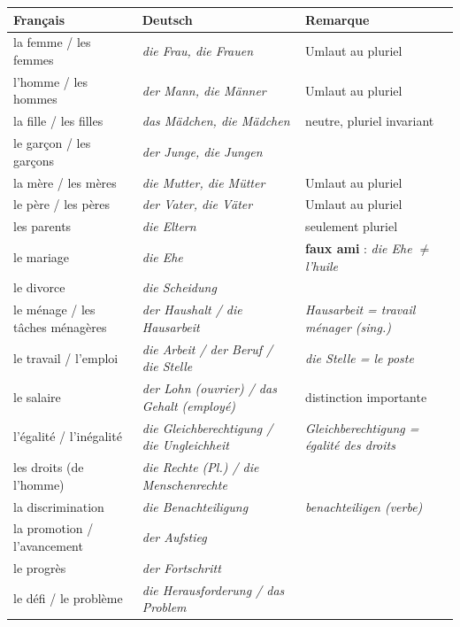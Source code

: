 \documentclass[11pt]{article}
\newcommand{\all}[1]{\ifmmode\text{\textit{#1}}\else\begingroup\selectlanguage{ngerman}\itshape #1\endgroup\fi}
\begin{document}
\begin{aretenir}
\begin{center}
\begin{tabularx}{\linewidth}{|X|X|X|}
\hline
\rowcolor{popblueL} \textbf{Français} & \textbf{Deutsch} & \textbf{Remarque} \\
\hline
la femme / les femmes & \all{die Frau, die Frauen} & Umlaut au pluriel \\
l'homme / les hommes & \all{der Mann, die Männer} & Umlaut au pluriel \\
la fille / les filles & \all{das Mädchen, die Mädchen} & neutre, pluriel invariant \\
le garçon / les garçons & \all{der Junge, die Jungen} & \\
la mère / les mères & \all{die Mutter, die Mütter} & Umlaut au pluriel \\
le père / les pères & \all{der Vater, die Väter} & Umlaut au pluriel \\
les parents & \all{die Eltern} & seulement pluriel \\
le mariage & \all{die Ehe} & \textbf{faux ami} : \all{die Ehe} $\neq$ l'huile \\
le divorce & \all{die Scheidung} & \\
le ménage / les tâches ménagères & \all{der Haushalt} / \all{die Hausarbeit} & \all{Hausarbeit} = travail ménager (sing.) \\
le travail / l'emploi & \all{die Arbeit} / \all{der Beruf} / \all{die Stelle} & \all{die Stelle} = le poste \\
le salaire & \all{der Lohn} (ouvrier) / \all{das Gehalt} (employé) & distinction importante \\
l'égalité / l'inégalité & \all{die Gleichberechtigung} / \all{die Ungleichheit} & \all{Gleichberechtigung} = égalité des droits \\
les droits (de l'homme) & \all{die Rechte} (Pl.) / \all{die Menschenrechte} & \\
la discrimination & \all{die Benachteiligung} & \all{benachteiligen} (verbe) \\
la promotion / l'avancement & \all{der Aufstieg} & \\
le progrès & \all{der Fortschritt} & \\
le défi / le problème & \all{die Herausforderung} / \all{das Problem} & \\
\hline
\end{tabularx}
\end{center}


\end{aretenir}
\end{document}
